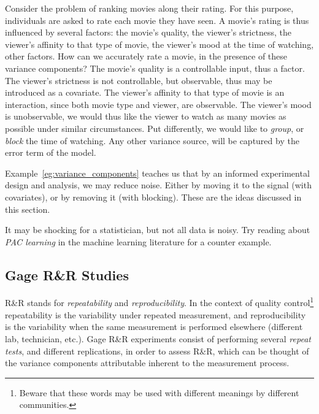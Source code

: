 \begin{example}
\label{eg:variance_components}
Consider the problem of ranking movies along their rating.
For this purpose, individuals are asked to rate each movie they have seen.
A movie's rating is thus influenced by several factors:
the movie's quality, 
the viewer's strictness, 
the viewer's affinity to that type of movie,
the viewer's mood at the time of watching,
other factors.
How can we accurately rate a movie, in the presence of these variance components?
The movie's quality is a controllable input, thus a factor.
The viewer's strictness is not controllable, but observable, thus may be introduced as a covariate.
The viewer's affinity to that type of movie is an interaction, since both movie type and viewer, are observable.
The viewer's mood is unobservable, we would thus like the viewer to watch as many movies as possible under similar circumstances. Put differently, we would like to \emph{group}, or \emph{block} the time of watching. 
Any other variance source, will be captured by the error term of the model. 
\end{example}

Example~\ref{eg:variance_components} teaches us that by an informed experimental design and analysis, we may reduce noise. Either by moving it to the signal (with covariates), or by removing it (with blocking).
These are the ideas discussed in this section.


\begin{extra}
\label{extra:pac_learning}
It may be shocking for a statistician, but not all data is noisy.
Try reading about \emph{PAC learning} in the machine learning literature for a counter example.
\end{extra}




\subsection{Gage R\&R Studies}
R\&R stands for \emph{repeatability} and \emph{reproducibility}.
In the context of quality control\footnote{Beware that these words may be used with different meanings by different communities.} repeatability is the variability under repeated measurement, and reproducibility is the variability when the same measurement is performed elsewhere (different lab, technician, etc.).
Gage R\&R experiments consist of performing several \emph{repeat tests}, and different replications, in order to assess R\&R, which can be thought of the variance components attributable inherent to the measurement process.




